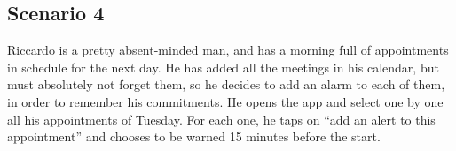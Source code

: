 \subsection{Scenario 4}
Riccardo is a pretty absent-minded man, and has a morning full of appointments in schedule for the next day. He has added all the meetings in his calendar, but must absolutely not forget them, so he decides to add an alarm to each of them, in order to remember his commitments. He opens the app and select one by one all his appointments of Tuesday. For each one, he taps on “add an alert to this appointment” and chooses to be warned 15 minutes before the start. 